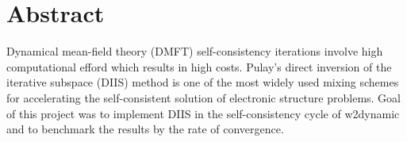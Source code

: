 \chapter*{Abstract}
\label{ch:abstract}

Dynamical mean-field theory (DMFT) self-consistency iterations involve high computational efford which results in high costs. Pulay's direct inversion of the iterative subspace (DIIS) method is one of the most widely used mixing schemes for accelerating the self-consistent solution of electronic structure problems. Goal of this project was to implement DIIS in the self-consistency cycle of w2dynamic and to benchmark the results by the rate of convergence.

